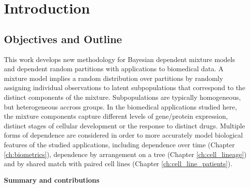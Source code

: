 \chapter{Introduction}
%

\section{Objectives and Outline}

This work develops new methodology for Bayesian dependent mixture models and dependent random partitions with applications to biomedical data. A mixture model implies a random distribution over partitions by randomly assigning individual observations to latent subpopulations that correspond to the distinct components of the mixture. Subpopulations are typically homogeneous, but heterogeneous accross groups. In the biomedical applications studied here, the mixture components capture different levels of gene/protein expression, distinct stages of cellular development or the response to distinct drugs. Multiple forms of dependence are considered in order to more accurately model biological features of the studied applications, including dependence over time (Chapter \ref{ch:biometrics}), dependence by arrangement on a tree (Chapter \ref{ch:cell_lineage}) and by shared match with paired cell lines (Chapter \ref{ch:cell_line_patients}).

\textbf{Summary and contributions}

